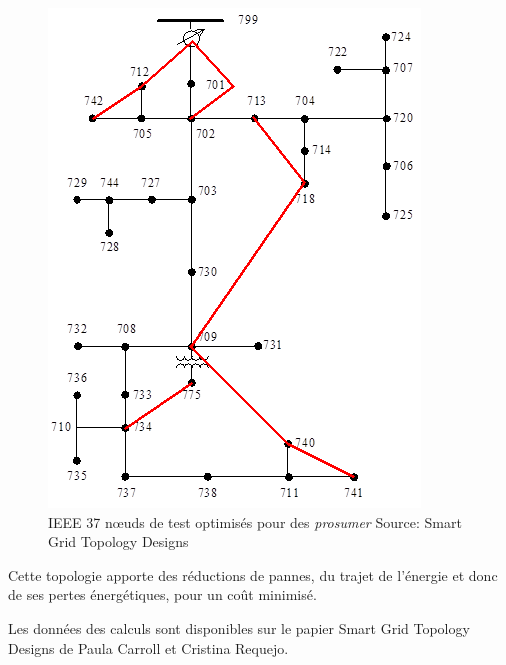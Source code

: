 \begin{figure}
  \includegraphics[scale=0.5]{media/ieee_radial_tree_optimized.png}
  \caption{
      IEEE 37 nœuds de test optimisés pour des \textit{prosumer}\newline
      \tiny{Source:\newline
        Smart Grid Topology Designs
      }
  }
  \label{fig:ieee_radial_tree_optimized}
\end{figure}

Cette topologie apporte des réductions de pannes, du trajet de l'énergie et donc de ses pertes énergétiques, pour un coût
minimisé.

Les données des calculs sont disponibles sur le papier Smart Grid Topology Designs de Paula Carroll et Cristina Requejo.